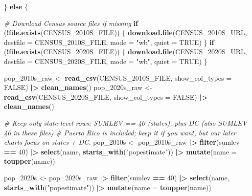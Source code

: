 \documentclass[
  11pt,
]{article}
\newenvironment{Shaded}{\begin{snugshade}}{\end{snugshade}}
\newcommand{\AttributeTok}[1]{\textcolor[rgb]{0.13,0.29,0.53}{#1}}
\newcommand{\CommentTok}[1]{\textcolor[rgb]{0.56,0.35,0.01}{\textit{#1}}}
\newcommand{\ConstantTok}[1]{\textcolor[rgb]{0.56,0.35,0.01}{#1}}
\newcommand{\ControlFlowTok}[1]{\textcolor[rgb]{0.13,0.29,0.53}{\textbf{#1}}}
\newcommand{\DecValTok}[1]{\textcolor[rgb]{0.00,0.00,0.81}{#1}}
\newcommand{\FunctionTok}[1]{\textcolor[rgb]{0.13,0.29,0.53}{\textbf{#1}}}
\newcommand{\NormalTok}[1]{#1}
\newcommand{\OtherTok}[1]{\textcolor[rgb]{0.56,0.35,0.01}{#1}}
\newcommand{\SpecialCharTok}[1]{\textcolor[rgb]{0.81,0.36,0.00}{\textbf{#1}}}
\newcommand{\StringTok}[1]{\textcolor[rgb]{0.31,0.60,0.02}{#1}}
\begin{document}
\begin{Shaded}
\begin{Highlighting}[]
\NormalTok{\} }\ControlFlowTok{else}\NormalTok{ \{}

  \CommentTok{\# Download Census source files if missing}
  \ControlFlowTok{if}\NormalTok{ (}\SpecialCharTok{!}\FunctionTok{file.exists}\NormalTok{(CENSUS\_2010S\_FILE)) \{}
    \FunctionTok{download.file}\NormalTok{(CENSUS\_2010S\_URL, }\AttributeTok{destfile =}\NormalTok{ CENSUS\_2010S\_FILE, }\AttributeTok{mode =} \StringTok{"wb"}\NormalTok{, }\AttributeTok{quiet =} \ConstantTok{TRUE}\NormalTok{)}
\NormalTok{  \}}
  \ControlFlowTok{if}\NormalTok{ (}\SpecialCharTok{!}\FunctionTok{file.exists}\NormalTok{(CENSUS\_2020S\_FILE)) \{}
    \FunctionTok{download.file}\NormalTok{(CENSUS\_2020S\_URL, }\AttributeTok{destfile =}\NormalTok{ CENSUS\_2020S\_FILE, }\AttributeTok{mode =} \StringTok{"wb"}\NormalTok{, }\AttributeTok{quiet =} \ConstantTok{TRUE}\NormalTok{)}
\NormalTok{  \}}

\NormalTok{  pop\_2010s\_raw }\OtherTok{\textless{}{-}} \FunctionTok{read\_csv}\NormalTok{(CENSUS\_2010S\_FILE, }\AttributeTok{show\_col\_types =} \ConstantTok{FALSE}\NormalTok{) }\SpecialCharTok{|\textgreater{}} \FunctionTok{clean\_names}\NormalTok{()}
\NormalTok{  pop\_2020s\_raw }\OtherTok{\textless{}{-}} \FunctionTok{read\_csv}\NormalTok{(CENSUS\_2020S\_FILE, }\AttributeTok{show\_col\_types =} \ConstantTok{FALSE}\NormalTok{) }\SpecialCharTok{|\textgreater{}} \FunctionTok{clean\_names}\NormalTok{()}

  \CommentTok{\# Keep only state{-}level rows: SUMLEV == 40 (states), plus DC (also SUMLEV 40 in these files)}
  \CommentTok{\# Puerto Rico is included; keep it if you want, but our later charts focus on states + DC.}
\NormalTok{  pop\_2010s }\OtherTok{\textless{}{-}}\NormalTok{ pop\_2010s\_raw }\SpecialCharTok{|\textgreater{}}
    \FunctionTok{filter}\NormalTok{(sumlev }\SpecialCharTok{==} \DecValTok{40}\NormalTok{) }\SpecialCharTok{|\textgreater{}}
    \FunctionTok{select}\NormalTok{(name, }\FunctionTok{starts\_with}\NormalTok{(}\StringTok{"popestimate"}\NormalTok{)) }\SpecialCharTok{|\textgreater{}}
    \FunctionTok{mutate}\NormalTok{(}\AttributeTok{name =} \FunctionTok{toupper}\NormalTok{(name))}

\NormalTok{  pop\_2020s }\OtherTok{\textless{}{-}}\NormalTok{ pop\_2020s\_raw }\SpecialCharTok{|\textgreater{}}
    \FunctionTok{filter}\NormalTok{(sumlev }\SpecialCharTok{==} \DecValTok{40}\NormalTok{) }\SpecialCharTok{|\textgreater{}}
    \FunctionTok{select}\NormalTok{(name, }\FunctionTok{starts\_with}\NormalTok{(}\StringTok{"popestimate"}\NormalTok{)) }\SpecialCharTok{|\textgreater{}}
    \FunctionTok{mutate}\NormalTok{(}\AttributeTok{name =} \FunctionTok{toupper}\NormalTok{(name))}


\end{Highlighting}
\end{Shaded}
\end{document}
